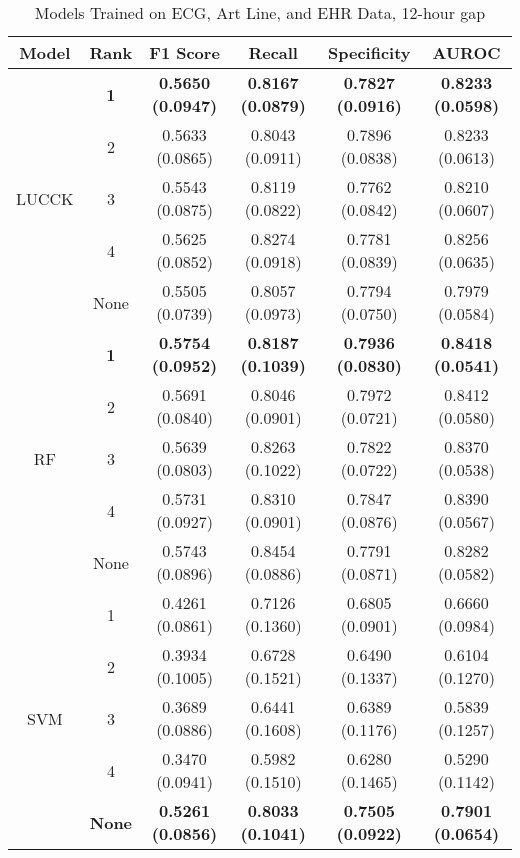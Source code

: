 \begin{table}
    \centering
    \caption{Models Trained on ECG, Art Line, and EHR Data, 12-hour gap}
    \begin{tabularx}{\textwidth}{|C|C|C|C|C|C|}
        \hline
        Model & Rank & F1 Score & Recall & Specificity & AUROC \\
        \hline
        & \textbf{1} & \textbf{0.5650 (0.0947)} & \textbf{0.8167 (0.0879)} & \textbf{0.7827 (0.0916)} & \textbf{0.8233 (0.0598)}\\
        & 2 & 0.5633 (0.0865) & 0.8043 (0.0911) & 0.7896 (0.0838) & 0.8233 (0.0613)\\
        LUCCK & 3 & 0.5543 (0.0875) & 0.8119 (0.0822) & 0.7762 (0.0842) & 0.8210 (0.0607)\\
        & 4 & 0.5625 (0.0852) & 0.8274 (0.0918) & 0.7781 (0.0839) & 0.8256 (0.0635)\\
        & None & 0.5505 (0.0739) & 0.8057 (0.0973) & 0.7794 (0.0750) & 0.7979 (0.0584)\\
        \hline                
        & \textbf{1} & \textbf{0.5754 (0.0952)} & \textbf{0.8187 (0.1039)} & \textbf{0.7936 (0.0830)} & \textbf{0.8418 (0.0541)}\\
        & 2 & 0.5691 (0.0840) & 0.8046 (0.0901) & 0.7972 (0.0721) & 0.8412 (0.0580)\\
        RF & 3 & 0.5639 (0.0803) & 0.8263 (0.1022) & 0.7822 (0.0722) & 0.8370 (0.0538)\\
        & 4 & 0.5731 (0.0927) & 0.8310 (0.0901) & 0.7847 (0.0876) & 0.8390 (0.0567)\\
        & None & 0.5743 (0.0896) & 0.8454 (0.0886) & 0.7791 (0.0871) & 0.8282 (0.0582)\\
        \hline
        & 1 & 0.4261 (0.0861) & 0.7126 (0.1360) & 0.6805 (0.0901) & 0.6660 (0.0984)\\
        & 2 & 0.3934 (0.1005) & 0.6728 (0.1521) & 0.6490 (0.1337) & 0.6104 (0.1270)\\
        SVM & 3 & 0.3689 (0.0886) & 0.6441 (0.1608) & 0.6389 (0.1176) & 0.5839 (0.1257)\\
        & 4 & 0.3470 (0.0941) & 0.5982 (0.1510) & 0.6280 (0.1465) & 0.5290 (0.1142)\\
        & \textbf{None} & \textbf{0.5261 (0.0856)} & \textbf{0.8033 (0.1041)} & \textbf{0.7505 (0.0922)} & \textbf{0.7901 (0.0654)}\\
        \hline
    \end{tabularx} 
\end{table}

\clearpage